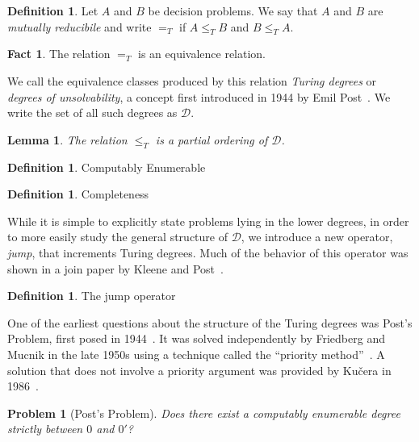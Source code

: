 \documentclass[psamsfonts]{amsart}
\newtheorem{lem}[thm]{Lemma}
\newtheorem{prob}[thm]{Problem}
\theoremstyle{definition}
\newtheorem{defn}[thm]{Definition}
\newtheorem{fact}[thm]{Fact}
\theoremstyle{remark}
\numberwithin{equation}{section}
\begin{document}
\begin{defn}
  Let $A$ and $B$ be decision problems. We say that $A$ and $B$ are
  \emph{mutually reducibile} and write $=_T$ if $A \leq_T B$ and $B \leq_T A$.
\end{defn}

\begin{fact}
  The relation $=_T$ is an equivalence relation.
\end{fact}

We call the equivalence classes produced by this relation \emph{Turing degrees}
or \emph{degrees of unsolvability}, a concept first introduced in
1944 by Emil Post~\cite{post44:_recur}. We write the set of all such degrees as $\mathcal{D}$.

\begin{lem}
  The relation $\leq_T$ is a partial ordering of $\mathcal{D}$.
\end{lem}

\begin{defn}
  Computably Enumerable
\end{defn}

\begin{defn}
  Completeness
\end{defn}

While it is simple to explicitly state problems lying in the lower degrees,
in order to more easily study the general structure of $\mathcal{D}$, we
introduce a new operator, \emph{jump}, that increments Turing degrees. Much of
the behavior of this operator was shown in a join paper by Kleene and Post~\cite{kleene54_upper_semi_lattic_degrees_recur_unsol}.

\begin{defn}
  The jump operator
\end{defn}

One of the earliest questions about the structure of the Turing degrees was
Post's Problem, first posed in 1944~\cite{post44:_recur}. It was solved
independently by Friedberg and Mucnik in the late 1950s using a technique
called the ``priority method''~\cite{Friedberg236, muchnik1956unsolvability}. A solution that does not
involve a priority argument was provided by Ku\v{c}era in 1986~\cite{Kucera:1986:APS:22416.22462}.

\begin{prob}[Post's Problem]  
  Does there exist a computably enumerable degree strictly between $0$ and $0'$?
\end{prob}
\end{document}
